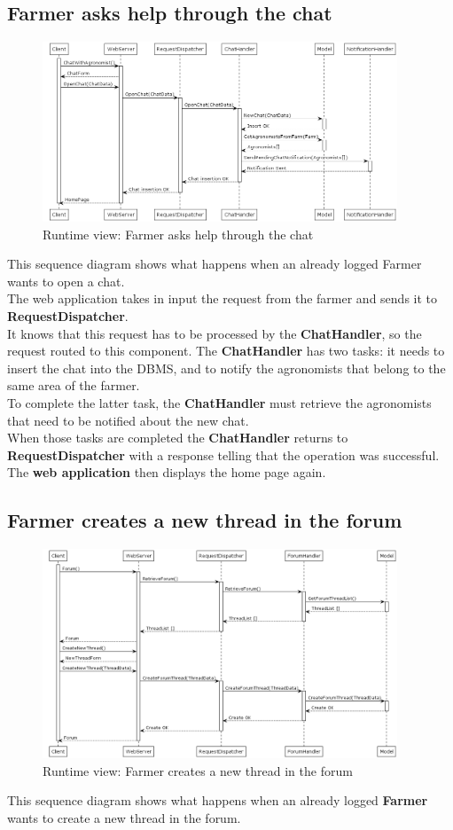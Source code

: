 \documentclass[10pt]{report}
\begin{document}
\subsection{Farmer asks help through the chat}
\begin{figure}[H]
    \centering
    \includegraphics[width=400px]{SequenceDiagram/Farmer_1_2.png}
    \caption{Runtime view: Farmer asks help through the chat}
\end{figure}
This sequence diagram shows what happens when an already logged Farmer wants to open a chat.\\
The web application takes in input the request from the farmer and sends it to \textbf{RequestDispatcher}.\\ It knows that this request has to be processed by the \textbf{ChatHandler}, so the request routed to this component.
The \textbf{ChatHandler} has two tasks: it needs to insert the chat into the DBMS, and to notify the agronomists that belong to the same area of the farmer.\\ To complete the latter task, the \textbf{ChatHandler} must retrieve the agronomists that need to be notified about the new chat.\\ When those tasks are completed the \textbf{ChatHandler} returns to \textbf{RequestDispatcher} with a response telling that the operation was successful.\\
The \textbf{web application} then displays the home page again.


\subsection{Farmer creates a new thread in the forum}
\begin{figure}[H]
    \centering
    \includegraphics[width=400px]{SequenceDiagram/Farmer_1_7.png}
    \caption{Runtime view: Farmer creates a new thread in the forum}
\end{figure}
This sequence diagram shows what happens when an already logged \textbf{Farmer} wants to create a new thread in the forum.
\end{document}

